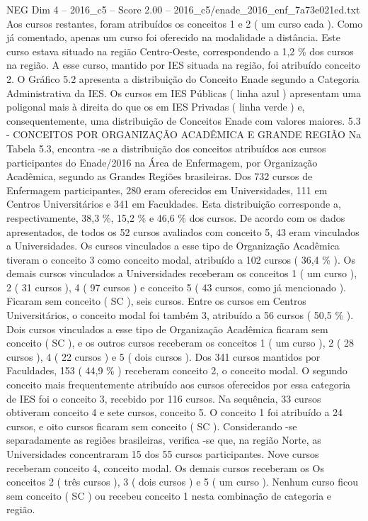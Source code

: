 \begin{textsample}{NEG Dim 4 – 2016\_c5 – Score 2.00 – 2016\_c5/enade\_2016\_enf\_7a73e021ed.txt}
Aos cursos restantes, foram atribuídos os conceitos 1 e 2 ( um curso cada ).
Como já comentado, apenas um curso foi oferecido na modalidade a distância.
Este curso estava situado na região Centro-Oeste, correspondendo a 1,2 \% dos cursos na região.
A esse curso, mantido por IES situada na região, foi atribuído conceito 2.
O Gráfico 5.2 apresenta a distribuição do Conceito Enade segundo a Categoria Administrativa da IES.
Os cursos em IES Públicas ( linha azul ) apresentam uma poligonal mais à direita do que os em IES Privadas ( linha verde ) e, consequentemente, uma distribuição de Conceitos Enade com valores maiores. 5.3 - CONCEITOS POR ORGANIZAÇÃO ACADÊMICA E GRANDE REGIÃO Na Tabela 5.3, encontra -se a distribuição dos conceitos atribuídos aos cursos participantes do Enade/2016 na Área de Enfermagem, por Organização Acadêmica, segundo as Grandes Regiões brasileiras.
Dos 732 cursos de Enfermagem participantes, 280 eram oferecidos em Universidades, 111 em Centros Universitários e 341 em Faculdades.
Esta distribuição corresponde a, respectivamente, 38,3 \%, 15,2 \% e 46,6 \% dos cursos.
De acordo com os dados apresentados, de todos os 52 cursos avaliados com conceito 5, 43 eram vinculados a Universidades.
Os cursos vinculados a esse tipo de Organização Acadêmica tiveram o conceito 3 como conceito modal, atribuído a 102 cursos ( 36,4 \% ).
Os demais cursos vinculados a Universidades receberam os conceitos 1 ( um curso ), 2 ( 31 cursos ), 4 ( 97 cursos ) e conceito 5 ( 43 cursos, como já mencionado ).
Ficaram sem conceito ( SC ), seis cursos.
Entre os cursos em Centros Universitários, o conceito modal foi também 3, atribuído a 56 cursos ( 50,5 \% ).
Dois cursos vinculados a esse tipo de Organização Acadêmica ficaram sem conceito ( SC ), e os outros cursos receberam os conceitos 1 ( um curso ), 2 ( 28 cursos ), 4 ( 22 cursos ) e 5 ( dois cursos ).
Dos 341 cursos mantidos por Faculdades, 153 ( 44,9 \% ) receberam conceito 2, o conceito modal.
O segundo conceito mais frequentemente atribuído aos cursos oferecidos por essa categoria de IES foi o conceito 3, recebido por 116 cursos.
Na sequência, 33 cursos obtiveram conceito 4 e sete cursos, conceito 5.
O conceito 1 foi atribuído a 24 cursos, e oito cursos ficaram sem conceito ( SC ).
Considerando -se separadamente as regiões brasileiras, verifica -se que, na região Norte, as Universidades concentraram 15 dos 55 cursos participantes.
Nove cursos receberam conceito 4, conceito modal.
Os demais cursos receberam os Os conceitos 2 ( três cursos ), 3 ( dois cursos ) e 5 ( um curso ).
Nenhum curso ficou sem conceito ( SC ) ou recebeu conceito 1 nesta combinação de categoria e região.

\end{textsample}
